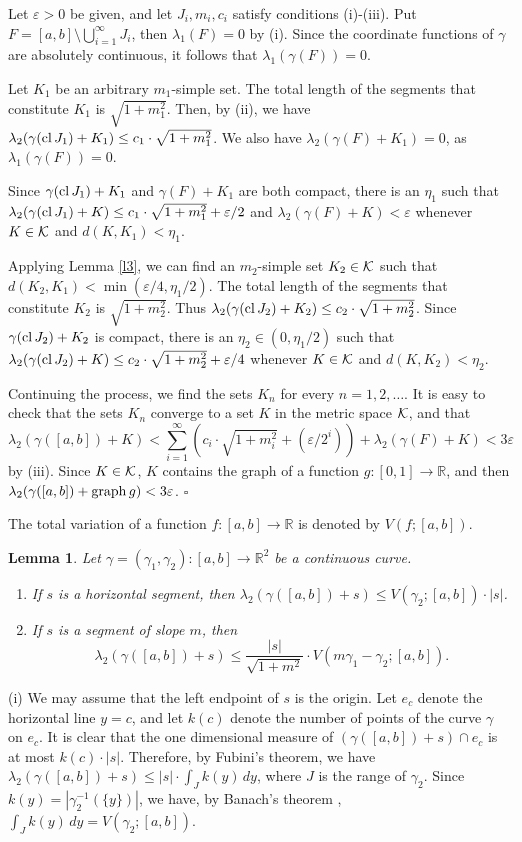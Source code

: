\documentclass[12pt]{article}
\newtheorem{lemma}[theorem]{Lemma}
\def\rr{{\mathbb R}}
\def\kk{{\cal K}}
\def\sik{{\rr}^2}
\def\am{^{-1}}
\def\se{\setminus}
\def\ga{\gamma}
\def\ep{\varepsilon}
\def\la{\lambda}
\def\cd{\cdot}
\def\cl{{\rm cl}\, }
\def\nl{[0,1]}
\def\proof{\noindent {\bf Proof.} }
\def\graph{{\rm graph}\, }
\begin{document}
Let $\ep >0$ be given, and let $J_i ,m_i ,c_i$ satisfy conditions (i)-(iii).
Put $F=[a,b]\se \bigcup_{i=1}^\infty J_i$, then $\la _1 (F)=0$ by (i). Since the
coordinate functions of $\ga$  are absolutely continuous, it follows that
$\la _1 (\ga (F)) =0$.

Let $K_1$ be an arbitrary $m_1$-simple set. The total length of the segments
that constitute $K_1$ is $\sqrt{1+m_1^2}$. Then, by (ii), we have
$\la _2 (\ga (\cl J_1 )+K_1 )\le c_1 \cd \sqrt{1+m_1^2}$. We also have $\la _2 (\ga (F)+K_1 )=0$, as $\la _1 (\ga (F))=0$.

Since $\ga (\cl J_1 )+K_1$ and $\ga (F)+K_1$ are both compact, there is an
$\eta _1$ such that  $\la _2 (\ga (\cl J_1 )+K)\le c_1 \cd \sqrt{1+m_1^2} +
\ep /2$ and $\la _2 (\ga (F)+K)<\ep$ whenever $K\in \kk$ and $d(K,K_1 )<
\eta _1$.

Applying Lemma \ref{l3}, we can find an $m_2$-simple set $K_2 \in \kk$ such
that $d(K_2 ,K_1 )<\min (\ep /4, \eta _1 /2)$.
The total length of the segments that constitute $K_2$ is $\sqrt{1+m_2^2}$.
Thus $\la _2 (\ga (\cl J_2 )+K_2 )\le c_2 \cd \sqrt{1+m_2^2}$.
Since $\ga (\cl J_2 )+K_2$ is compact, there is an $\eta _2 \in (0,\eta _1 /2)$
such that $\la _2 (\ga (\cl J_2 )+K)\le c_2 \cd \sqrt{1+m_2^2} +\ep /4$ whenever
$K\in \kk$ and $d(K,K_2 )<\eta _2$.

Continuing the process, we find the sets $K_n$ for every $n=1,2,\ldots$.
It is easy to check that the sets $K_n$ converge to a set $K$ in the
metric space $\kk$, and that
$$\la _2 (\ga ([a,b]) +K)<\sum_{i=1}^\infty \left( c_i \cd \sqrt{1+m_i^2} +
(\ep /2^i )\right) + \la _2 (\ga (F)+K )<3\ep$$
by (iii). Since $K\in \kk$, $K$ contains the graph of a function 
$g\colon \nl \to \rr$, and then $\la _2 (\ga ([a,b] ) + \graph g) <
3\ep$. \hfill $\square$ 

The total variation of a function $f\colon [a,b] \to \rr$ is denoted by
$V(f;[a,b])$.

\begin{lemma} \label{l5}
Let $\ga =(\ga _1 ,\ga _2 )\colon [a,b] \to \sik$ be a continuous curve.
\begin{enumerate}[{\rm (i)}]
\item If $s$ is a horizontal segment, then $\la _2 (\ga ([a,b])+s)\le
V(\ga _2 ; [a,b])\cd |s|$.
\item If $s$ is a segment of slope $m$, then
$$\la _2 (\ga ([a,b])+s)\le \frac{|s|}{\sqrt{1+m^2}} \cd V(m\ga _1 -\ga _2 ;
[a,b]).$$
\end{enumerate}
\end{lemma}
\proof
(i) We may assume that the left endpoint of $s$ is the origin. Let $e_c$ denote
the horizontal line $y=c$, and let $k(c)$ denote the number
of points of the curve $\ga$ on $e_c$. It is clear that the one dimensional
measure of $(\ga ([a,b])+s) \cap e_c$ is at most $k(c)\cd |s|$. Therefore, by
Fubini's theorem, we have $\la _2 (\ga ([a,b])+s)\le |s|\cd \int_J k(y)\, dy$,
where $J$ is the range of $\ga _2$. Since $k(y)=|\ga _2 \am (\{ y\} )|$,
we have, by Banach's theorem \cite[Theorem 6.4, Chapter IX, p. 280]{Saks},
$\int_J k(y)\, dy =V(\ga _2 ; [a,b])$.
\end{document}
